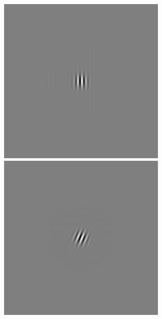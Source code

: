 \begin{figure}[ht]
\begin{center}
 \includegraphics[width=\columnwidth/9]{ch4/figures/iGabor1_0.jpg}
 \includegraphics[width=\columnwidth/9]{ch4/figures/iGabor1_1.jpg}

\end{center}
\end{figure}

